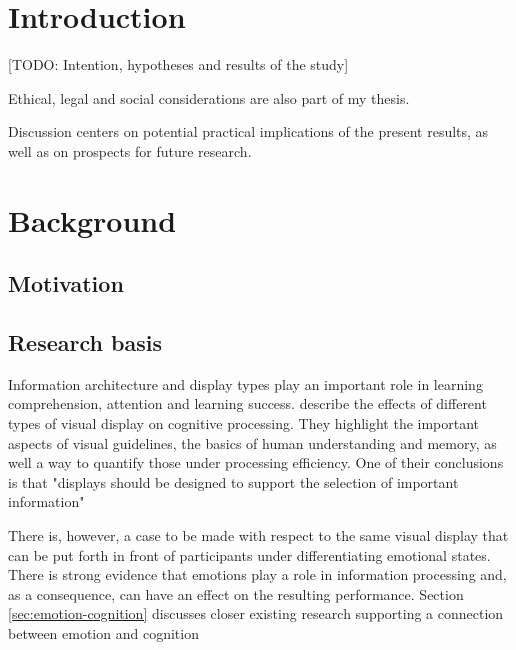 \clearpage

\section{Introduction}

[TODO: Intention, hypotheses and results of the study]

Ethical, legal and social considerations are also part of my thesis.


Discussion centers on potential practical implications of the present results, as well as on prospects for future research.

\clearpage

\section{Background}

	\subsection{Motivation}
	
	
	
		
	\subsection{Research basis} \label{sec:research}
	
	
	Information architecture and display types play an important role in learning comprehension, attention and learning success. \cite{McCrudden2017} describe the effects of different types of visual display on cognitive processing. They highlight the important aspects of visual guidelines, the basics of human understanding and  memory, as well a way to quantify those under processing efficiency. One of their conclusions is that "displays should be designed to support the selection of important information" \cite[p.633]{McCrudden2017}
	
	There is, however, a case to be made with respect to the same visual display that can be put forth in front of participants under differentiating emotional states. There is strong evidence that emotions play a role in information processing and, as a consequence, can have an effect on the resulting performance. Section \ref{sec:emotion-cognition} discusses closer existing research supporting a connection between emotion and cognition
	
